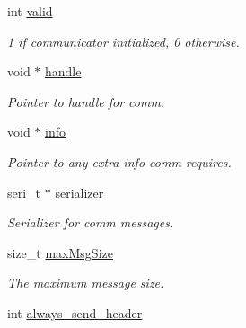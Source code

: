 \begin{DoxyCompactItemize}
\mbox{\label{structcomm__t_afe8a58007e764fb3f2e906025f89fe72}} 
int \mbox{\hyperlink{structcomm__t_afe8a58007e764fb3f2e906025f89fe72}{valid}}
\begin{DoxyCompactList}\small\item\em 1 if communicator initialized, 0 otherwise. \end{DoxyCompactList}\item 
\mbox{\label{structcomm__t_ab7b58a54178acddc3f641e3a285aab7f}} 
void $\ast$ \mbox{\hyperlink{structcomm__t_ab7b58a54178acddc3f641e3a285aab7f}{handle}}
\begin{DoxyCompactList}\small\item\em Pointer to handle for comm. \end{DoxyCompactList}\item 
\mbox{\label{structcomm__t_ac805f6f060d8a6d7be78e9e782d15fdd}} 
void $\ast$ \mbox{\hyperlink{structcomm__t_ac805f6f060d8a6d7be78e9e782d15fdd}{info}}
\begin{DoxyCompactList}\small\item\em Pointer to any extra info comm requires. \end{DoxyCompactList}\item 
\mbox{\label{structcomm__t_a2c1ca12d0df5193d4a023301aa156e8f}} 
\mbox{\hyperlink{structseri__t}{seri\+\_\+t}} $\ast$ \mbox{\hyperlink{structcomm__t_a2c1ca12d0df5193d4a023301aa156e8f}{serializer}}
\begin{DoxyCompactList}\small\item\em Serializer for comm messages. \end{DoxyCompactList}\item 
\mbox{\label{structcomm__t_a9aecec459dff6ce20398f1c110f8f3f4}} 
size\+\_\+t \mbox{\hyperlink{structcomm__t_a9aecec459dff6ce20398f1c110f8f3f4}{max\+Msg\+Size}}
\begin{DoxyCompactList}\small\item\em The maximum message size. \end{DoxyCompactList}\item 
\mbox{\label{structcomm__t_a9810578a787d8503b00bcb78a592073d}} 
int \mbox{\hyperlink{structcomm__t_a9810578a787d8503b00bcb78a592073d}{always\+\_\+send\+\_\+header}}

\end{DoxyCompactItemize}
